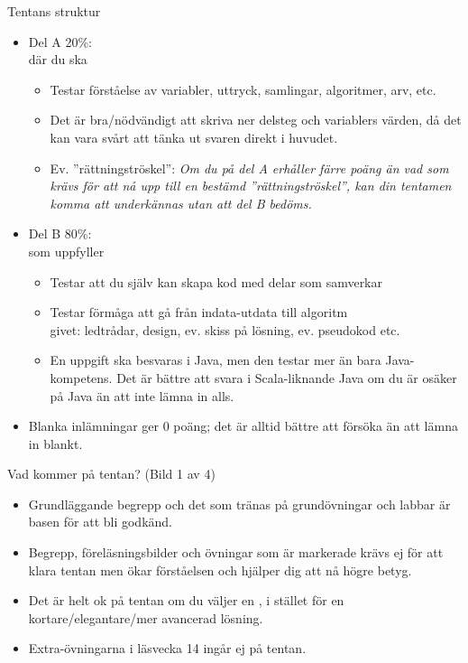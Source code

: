 \begin{Slide}{Tentans struktur}
\begin{itemize}
\item Del A 20\%:\\ där du ska 
\begin{itemize}\SlideFontTiny
\item Testar förståelse av variabler, uttryck, samlingar, algoritmer, arv, etc.
\item Det är bra/nödvändigt att skriva ner delsteg och variablers värden, då det kan vara svårt att tänka ut svaren direkt i huvudet.
\item Ev. ''rättningströskel'': \textit{Om du på del A erhåller färre poäng än vad som krävs för att nå upp till en bestämd ''rättningströskel'', kan din tentamen komma att underkännas utan att del B bedöms.}
\end{itemize}


\item Del B 80\%:\\ som uppfyller 
\begin{itemize}\SlideFontTiny
\item Testar att du själv kan skapa kod med delar som samverkar
\item Testar förmåga att gå från indata-utdata till algoritm \\
 givet: ledtrådar, design, ev. skiss på lösning, ev. pseudokod etc.
\item En uppgift ska besvaras i Java, men den testar mer än bara Java-kompetens. Det är bättre att svara i Scala-liknande Java om du är osäker på Java än att inte lämna in alls.
\end{itemize}
\item Blanka inlämningar ger 0 poäng; det är alltid bättre att försöka än att lämna in blankt.
\end{itemize}
\end{Slide}


\begin{Slide}{Vad kommer på tentan? (Bild 1 av 4)}
\begin{itemize}
\item Grundläggande begrepp och det som tränas på grundövningar och labbar är basen för att bli godkänd.
\item Begrepp, föreläsningsbilder och övningar som är markerade  krävs ej för att klara tentan men ökar förståelsen och hjälper dig att nå högre betyg.
\item Det är helt ok på tentan om du väljer en  , i stället för en kortare/elegantare/mer avancerad lösning.
\item Extra-övningarna i läsvecka 14 ingår ej på tentan.
\end{itemize}
\end{Slide}



